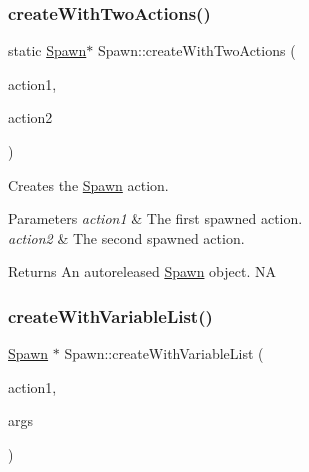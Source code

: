 \subsubsection{\texorpdfstring{create\+With\+Two\+Actions()}{createWithTwoActions()}\hspace{0.1cm}{\footnotesize\ttfamily [2/2]}}
{\footnotesize\ttfamily static \hyperlink{classSpawn}{Spawn}$\ast$ Spawn\+::create\+With\+Two\+Actions (\begin{DoxyParamCaption}\item[{\hyperlink{classFiniteTimeAction}{Finite\+Time\+Action} $\ast$}]{action1,  }\item[{\hyperlink{classFiniteTimeAction}{Finite\+Time\+Action} $\ast$}]{action2 }\end{DoxyParamCaption})\hspace{0.3cm}{\ttfamily [static]}}

Creates the \hyperlink{classSpawn}{Spawn} action.


\begin{DoxyParams}{Parameters}
{\em action1} & The first spawned action. \\
\hline
{\em action2} & The second spawned action. \\
\hline
\end{DoxyParams}
\begin{DoxyReturn}{Returns}
An autoreleased \hyperlink{classSpawn}{Spawn} object.  NA 
\end{DoxyReturn}
\mbox{\label{classSpawn_a08a30e179a171b59c3770a190f93443e}} 
\subsubsection{\texorpdfstring{create\+With\+Variable\+List()}{createWithVariableList()}\hspace{0.1cm}{\footnotesize\ttfamily [1/2]}}
{\footnotesize\ttfamily \hyperlink{classSpawn}{Spawn} $\ast$ Spawn\+::create\+With\+Variable\+List (\begin{DoxyParamCaption}\item[{\hyperlink{classFiniteTimeAction}{Finite\+Time\+Action} $\ast$}]{action1,  }\item[{va\+\_\+list}]{args }\end{DoxyParamCaption})\hspace{0.3cm}{\ttfamily [static]}}

